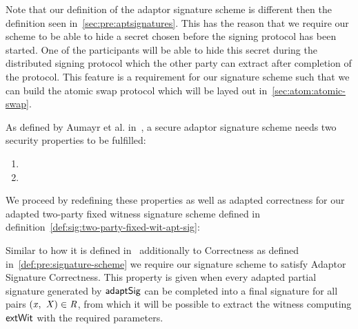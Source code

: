 Note that our definition of the adaptor signature scheme is different then the definition seen in~\ref{sec:pre:aptsignatures}. This has the reason that we require our scheme to be able to hide a secret chosen before
the signing protocol has been started. One of the participants will be able to hide this secret during the distributed signing protocol which the other party can extract after completion of the protocol. This feature
is a requirement for our signature scheme such that we can build the atomic swap protocol which will be layed out in~\ref{sec:atom:atomic-swap}.

\begin{definition}[\cnstSecureAptScheme]
    \label{def:sig:apt-sig-security}
    As defined by Aumayr et al. in~\cite{aumayr2020bitcoinchannels}, a secure adaptor signature scheme needs two security properties to be fulfilled:
    \begin{enumerate}
        \item \cnstaEUFCMA
        \item \cnstWitnessExtractability
    \end{enumerate}
\end{definition}

We proceed by redefining these properties as well as adapted correctness for our adapted two-party fixed witness signature scheme defined in definition~\ref{def:sig:two-party-fixed-wit-apt-sig}:

Similar to how it is defined in~\cite{aumayr2020bitcoinchannels} additionally to Correctness as defined in~\ref{def:pre:signature-scheme} we require our signature scheme to satisfy Adaptor Signature Correctness.
This property is given when every adapted partial signature generated by $\mathsf{adaptSig}$ can be completed into a final signature for all pairs $(\mathit{x} ,~ \mathit{X}) \in \mathit{R}$, from which it will
be possible to extract the witness computing $\mathsf{extWit}$ with the required parameters.

